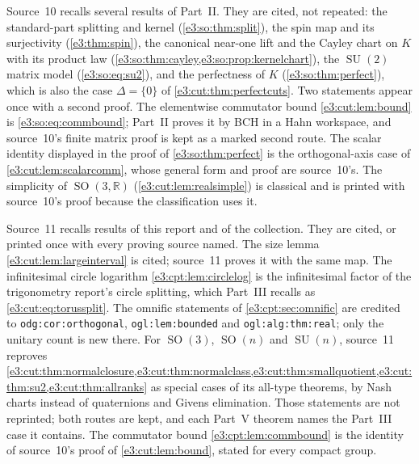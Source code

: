 \documentclass[11pt,letterpaper]{article}
\numberwithin{equation}{section}
\theoremstyle{definition}
\theoremstyle{remark}
\newcommand{\R}{\mathbb R}
\newcommand{\SO}{\operatorname{SO}}
\newcommand{\SU}{\operatorname{SU}}
\begin{document}
Source~10 recalls several results of Part~II. They are cited, not repeated:
the standard-part splitting and kernel (\cref{e3:so:thm:split}), the spin map
and its surjectivity (\cref{e3:thm:spin}), the canonical near-one lift and the
Cayley chart on $K$ with its product law
(\cref{e3:so:thm:cayley,e3:so:prop:kernelchart}), the $\SU(2)$ matrix model
(\cref{e3:so:eq:su2}), and the perfectness of $K$ (\cref{e3:so:thm:perfect}),
which is also the case $\Delta=\{0\}$ of \cref{e3:cut:thm:perfectcuts}. Two
statements appear once with a second proof. The elementwise commutator bound
\cref{e3:cut:lem:bound} is \cref{e3:so:eq:commbound}; Part~II proves it by BCH in
a Hahn workspace, and source~10's finite matrix proof is kept as a marked second
route. The scalar identity displayed in the proof of \cref{e3:so:thm:perfect} is
the orthogonal-axis case of \cref{e3:cut:lem:scalarcomm}, whose general form and
proof are source~10's. The simplicity of $\SO(3,\R)$
(\cref{e3:cut:lem:realsimple}) is classical and is printed with source~10's
proof because the classification uses it.

Source~11 recalls results of this report and of the collection. They are cited,
or printed once with every proving source named. The size lemma
\cref{e3:cut:lem:largeinterval} is cited; source~11 proves it with the same map.
The infinitesimal circle logarithm \cref{e3:cpt:lem:circlelog} is the
infinitesimal factor of the trigonometry report's circle splitting, which Part~III
recalls as \cref{e3:cut:eq:torussplit}. The omnific statements of
\cref{e3:cpt:sec:omnific} are credited to \texttt{odg:cor:orthogonal},
\texttt{ogl:lem:bounded} and \texttt{ogl:alg:thm:real}; only the unitary count is
new there. For $\SO(3)$, $\SO(n)$ and $\SU(n)$, source~11 reproves
\cref{e3:cut:thm:normalclosure,e3:cut:thm:normalclass,e3:cut:thm:smallquotient,e3:cut:thm:su2,e3:cut:thm:allranks}
as special cases of its all-type theorems, by Nash charts instead of
quaternions and Givens elimination. Those statements are not reprinted; both
routes are kept, and each Part~V theorem names the Part~III case it contains.
The commutator bound \cref{e3:cpt:lem:commbound} is the identity of source~10's
proof of \cref{e3:cut:lem:bound}, stated for every compact group.
\end{document}
